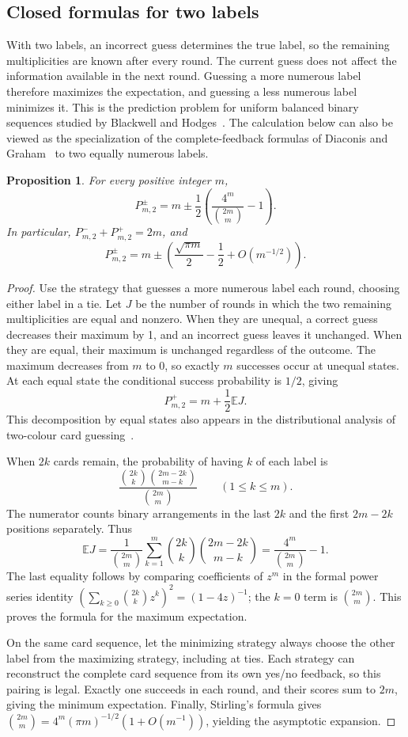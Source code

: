 \documentclass[11pt,reqno]{amsart}
\numberwithin{equation}{section}
\newtheorem{proposition}[theorem]{Proposition}
\theoremstyle{remark}
\theoremstyle{definition}
\newcommand{\E}{\mathbb E}
\begin{document}
\subsection{Closed formulas for two labels}
With two labels, an incorrect guess determines the true label, so the remaining multiplicities are known after every round. The current guess does not affect the information available in the next round. Guessing a more numerous label therefore maximizes the expectation, and guessing a less numerous label minimizes it. This is the prediction problem for uniform balanced binary sequences studied by Blackwell and Hodges~\cite[Section~0]{BH}. The calculation below can also be viewed as the specialization of the complete-feedback formulas of Diaconis and Graham~\cite[Section~2]{DG} to two equally numerous labels.
\begin{proposition}\label{app:prop:two}
For every positive integer $m$,
\[
 P^\pm_{m,2}=m\pm\frac12\left(\frac{4^m}{\binom{2m}{m}}-1\right).
\]
In particular, $P^-_{m,2}+P^+_{m,2}=2m$, and
\[
 P^\pm_{m,2}=m\pm\left(\frac{\sqrt{\pi m}}2-\frac12+O(m^{-1/2})\right).
\]
\end{proposition}
\begin{proof}
Use the strategy that guesses a more numerous label each round, choosing either label in a tie. Let $J$ be the number of rounds in which the two remaining multiplicities are equal and nonzero. When they are unequal, a correct guess decreases their maximum by 1, and an incorrect guess leaves it unchanged. When they are equal, their maximum is unchanged regardless of the outcome. The maximum decreases from $m$ to 0, so exactly $m$ successes occur at unequal states. At each equal state the conditional success probability is $1/2$, giving
\[
 P^+_{m,2}=m+\frac12\E J.
\]
This decomposition by equal states also appears in the distributional analysis of two-colour card guessing~\cite[Lemmas~1 and~2]{KPtwo}.

When $2k$ cards remain, the probability of having $k$ of each label is
\[
 \frac{\binom{2k}{k}\binom{2m-2k}{m-k}}{\binom{2m}{m}}
 \qquad(1\le k\le m).
\]
The numerator counts binary arrangements in the last $2k$ and the first $2m-2k$ positions separately. Thus
\[
 \E J=\frac1{\binom{2m}{m}}
 \sum_{k=1}^m\binom{2k}{k}\binom{2m-2k}{m-k}
 =\frac{4^m}{\binom{2m}{m}}-1.
\]
The last equality follows by comparing coefficients of $z^m$ in the formal power series identity $(\sum_{k\ge0}\binom{2k}{k}z^k)^2=(1-4z)^{-1}$; the $k=0$ term is $\binom{2m}{m}$. This proves the formula for the maximum expectation.

On the same card sequence, let the minimizing strategy always choose the other label from the maximizing strategy, including at ties. Each strategy can reconstruct the complete card sequence from its own yes/no feedback, so this pairing is legal. Exactly one succeeds in each round, and their scores sum to $2m$, giving the minimum expectation. Finally, Stirling's formula gives $\binom{2m}{m}=4^m(\pi m)^{-1/2}(1+O(m^{-1}))$, yielding the asymptotic expansion.
\end{proof}
\end{document}
